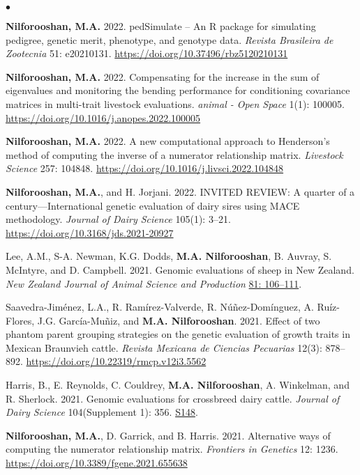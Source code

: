 \documentclass[margin,line]{res}
\newenvironment{list2}{
  \begin{list}{$\bullet$}{%
      \setlength{\itemsep}{0in}
      \setlength{\parsep}{0in} \setlength{\parskip}{0in}
      \setlength{\topsep}{0in} \setlength{\partopsep}{0in}
      \setlength{\leftmargin}{0.2in}}}{\end{list}}
\begin{document}
\begin{resume}
\begin{list2}
    \item {\bf Nilforooshan, M.A.} 2022. pedSimulate -- An R package for simulating pedigree, genetic merit, phenotype, and genotype data. {\em Revista Brasileira de Zootecnia} 51: e20210131. \url{https://doi.org/10.37496/rbz5120210131}
    \item {\bf Nilforooshan, M.A.} 2022. Compensating for the increase in the sum of eigenvalues and monitoring the bending performance for conditioning covariance matrices in multi-trait livestock evaluations. {\em animal - Open Space} 1(1): 100005. \url{https://doi.org/10.1016/j.anopes.2022.100005}
    \item {\bf Nilforooshan, M.A.} 2022. A new computational approach to Henderson's method of computing the inverse of a numerator relationship matrix. {\em Livestock Science} 257: 104848. \url{https://doi.org/10.1016/j.livsci.2022.104848}
    \item {\bf Nilforooshan, M.A.}, and H. Jorjani. 2022. INVITED REVIEW: A quarter of a century---International genetic evaluation of dairy sires using MACE methodology. {\em Journal of Dairy Science} 105(1): 3--21. \url{https://doi.org/10.3168/jds.2021-20927}
    \item Lee, A.M., S-A. Newman, K.G. Dodds, {\bf M.A. Nilforooshan}, B. Auvray, S. McIntyre, and D. Campbell. 2021. Genomic evaluations of sheep in New Zealand. {\em New Zealand Journal of Animal Science and Production} \href{http://www.nzsap.org/proceedings/genomic-evaluations-sheep-new-zealand}{81: 106--111}.
    \item Saavedra-Jim\'{e}nez, L.A., R. Ram\'{i}rez-Valverde, R. N\'{u}\~{n}ez-Dom\'{i}nguez, A. Ru\'{i}z-Flores, J.G. Garc\'{i}a-Mu\~{n}iz, and {\bf M.A. Nilforooshan}. 2021. Effect of two phantom parent grouping strategies on the genetic evaluation of growth traits in Mexican Braunvieh cattle. {\em Revista Mexicana de Ciencias Pecuarias} 12(3): 878--892. \url{https://doi.org/10.22319/rmcp.v12i3.5562}
    \item Harris, B., E. Reynolds, C. Couldrey, {\bf M.A. Nilforooshan}, A. Winkelman, and R. Sherlock. 2021. Genomic evaluations for crossbreed dairy cattle. {\em Journal of Dairy Science} 104(Supplement 1): 356. \href{https://www.adsa.org/Portals/0/SiteContent/Docs/Meetings/2021ADSA/ADSA2021_Abstracts.pdf}{S148}.
    \item {\bf Nilforooshan, M.A.}, D. Garrick, and B. Harris. 2021. Alternative ways of computing the numerator relationship matrix. {\em Frontiers in Genetics} 12: 1236. \url{https://doi.org/10.3389/fgene.2021.655638}

\end{list2}
\end{resume}
\end{document}
